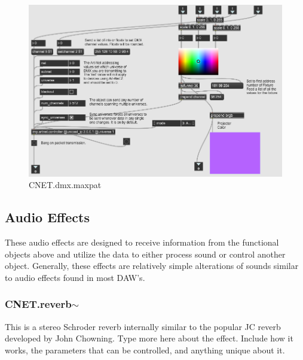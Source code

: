 \begin{figure}
    \centering
    \includegraphics[scale=0.85]{diagrams/maxPatches/CNET.dmx.png}
    \caption{CNET.dmx.maxpat}
    \label{fig:CNET.dmx.maxpat}
\end{figure}

\subsection{Audio Effects}
These audio effects are designed to receive information from the functional objects above and utilize the data to either process sound or control another object. Generally, these effects are relatively simple alterations of sounds similar to audio effects found in most DAW's.

\subsubsection{CNET.reverb$\sim$}
This is a stereo Schroder reverb internally similar to the popular JC reverb developed by John Chowning. Type more here about the effect. Include how it works, the parameters that can be controlled, and anything unique about it. 

